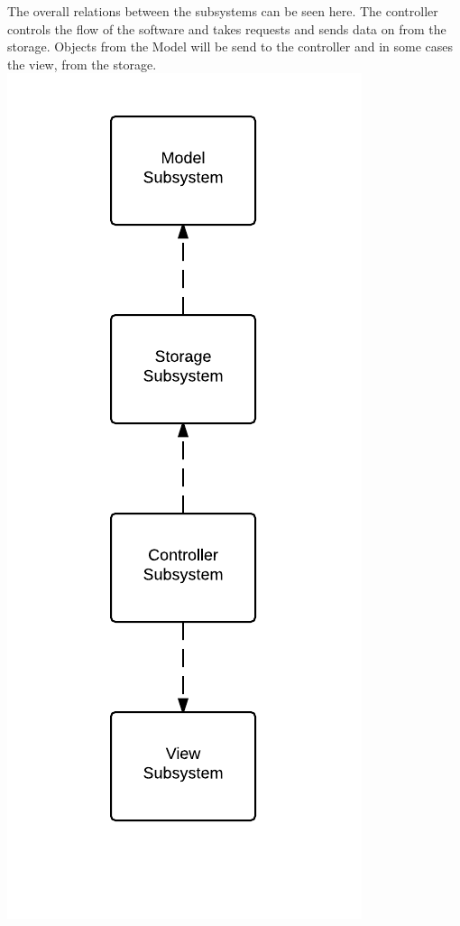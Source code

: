 The overall relations between the subsystems can be seen here. The controller controls the flow of the software and takes requests and sends data on from the storage. Objects from the Model will be send to the controller and in some cases the view, from the storage.
\includegraphics[scale=0.8]{OverallSubsystemDecomposition}

